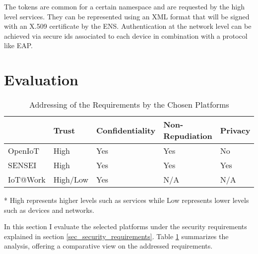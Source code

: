\documentclass[journal]{IEEEtran}
\begin{document}
  The tokens are common for a certain namespace and are requested by the high level services. They can be represented using an XML format that will be signed with an X.509 certificate by the ENS. Authentication at the network level can be achieved via secure ids associated to each device in combination with a protocol like EAP.

\section{Evaluation}
  
  \begin{table}[!t]
    \begin{threeparttable}
      \renewcommand{\arraystretch}{1.3}    
      \caption{Addressing of the Requirements by the Chosen Platforms}
      \label{evaluation_table}        
      \begin{tabular} {
                        p{1cm}
                        >{\centering\arraybackslash}p{1.3cm}
                        >{\centering\arraybackslash}p{1.5cm}
                        >{\centering\arraybackslash}p{2cm}
                        >{\centering\arraybackslash}p{1cm}
                      }
        \hline      
                     & Trust \tnote{*}      & Confidentiality & Non-Repudiation & Privacy \\
        \hline
        OpenIoT      & High       & Yes             & Yes             & No      \\
        SENSEI       & High       & Yes             & Yes             & Yes     \\
        IoT@Work     & High/Low   & Yes             & N/A             & N/A     \\ 
        \hline      
      \end{tabular}
      \begin{tablenotes}
      \item[*] High represents higher levels such as services while Low represents lower levels such as devices and networks.
      \end{tablenotes}
    \end{threeparttable}
  \end{table}

  In this section I evaluate the selected platforms under the security requirements explained in section \ref{sec_security_requirements}. Table \ref{evaluation_table} summarizes the analysis, offering a comparative view on the addressed requirements. 
  
\end{document}
